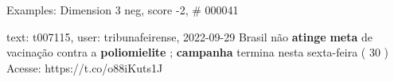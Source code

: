 \begin{frame}{Examples: Dimension 3 neg, score -2, \# 000041}
\footnotesize
\begin{alertblock}{text: t007115, user: tribunafeirense, 2022-09-29}
Brasil não \textbf{atinge} \textbf{meta} de vacinação contra a 
\textbf{poliomielite} ; \textbf{campanha} termina nesta sexta-feira ( 30 ) 
Acesse: https://t.co/o88iKuts1J 
\end{alertblock}
\end{frame}

